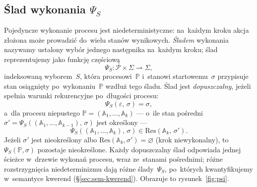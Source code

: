 \documentclass[11pt,a4paper]{article}
\theoremstyle{definition}
\begin{document}
\subsection{Ślad wykonania \texorpdfstring{$\Psi_S$}{Psi\_S}}

Pojedyncze wykonanie procesu jest niedeterministyczne: na~każdym kroku akcja złożona może prowadzić do~wielu stanów wynikowych. \emph{Śladem} wykonania nazywamy ustalony wybór jednego następnika na~każdym kroku; ślad reprezentujemy jako funkcję częściową
\[
  \Psi_S : \mathcal{P} \times \Sigma \rightharpoonup \Sigma,
\]
indeksowaną wyborem~$S$, która procesowi~$\mathbb{P}$ i~stanowi startowemu~$\sigma$ przypisuje stan osiągnięty po~wykonaniu~$\mathbb{P}$ wzdłuż tego śladu. Ślad jest \emph{dopuszczalny}, jeżeli spełnia warunki rekurencyjne po~długości procesu:
\[
  \Psi_S(\varepsilon,\,\sigma) = \sigma,
\]
a~dla procesu niepustego $\mathbb{P} = (\mathbb{A}_1,\ldots,\mathbb{A}_k)$ --- o~ile stan pośredni $\sigma' = \Psi_S((\mathbb{A}_1,\ldots,\mathbb{A}_{k-1}),\,\sigma)$ jest określony ---
\[
  \Psi_S((\mathbb{A}_1,\ldots,\mathbb{A}_k),\,\sigma) \in \mathrm{Res}(\mathbb{A}_k,\,\sigma') .
\]
Jeżeli $\sigma'$ jest nieokreślony albo $\mathrm{Res}(\mathbb{A}_k,\sigma') = \varnothing$ (krok niewykonalny), to $\Psi_S(\mathbb{P},\sigma)$ pozostaje nieokreślone. Każdy dopuszczalny ślad odpowiada jednej ścieżce w~drzewie wykonań procesu, wraz ze~stanami pośrednimi; różne rozstrzygnięcia niedeterminizmu dają różne ślady~$\Psi_S$, po~których kwantyfikujemy w~semantyce kwerend (\S\ref{sec:sem-kwerend}). Obrazuje to rysunek~\ref{fig:psi}.
\end{document}
